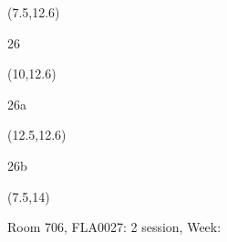 \documentclass[a4paper]{article}
\newcommand{\myseat}[4]{%
\vspace{-0.1cm}
\parbox[t][2.2cm][t]{3.5cm}{
\small #1 %
\begin{description}
\vspace{-0.1cm}
\item [ID:] #2
\vspace{-0.1cm}
\item [Team:] #3 \normalsize
\vspace{-0.1cm}
\item \normalsize #4
\vspace{-0.1cm}
\end{description}
}
}
\begin{document}
\begin{CJK}{UTF8}{cyberbit}
\begin{textblock}{2.5}(7.5,12.6)
\textblockcolor{}
\myseat{26}{}{}{}
\end{textblock}

\begin{textblock}{2.5}(10,12.6)
\textblockcolor{}
\myseat{26a}{}{}{}
\end{textblock}

\begin{textblock}{2.5}(12.5,12.6)
\textblockcolor{}
\myseat{26b}{}{}{}
\end{textblock}

\begin{textblock}{7.5}(7.5,14)
\textblockcolor{}
\parbox[t][2.2cm][t]{9.5cm}{%
\large Room 706, FLA0027: 2 session, Week: 
}
\end{textblock}

\end{CJK}
\end{document}
